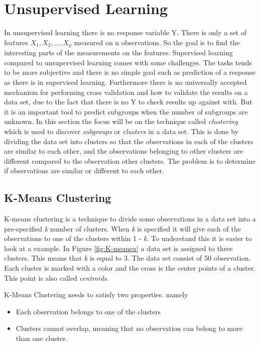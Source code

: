 \chapter{Unsupervised Learning}
\label{chp:unsuplea}
In unsupervised learning there is no response variable Y. There is only a set of features $X_1, X_2,..., X_p$ measured on n observations. So the goal is to find the interesting parts of the measurements on the features.
Supervised learning compared to unsupervised learning comes with some challenges. The tasks tends to be more subjective and there is no simple goal such as prediction of a response as there is in supervised learning. Furthermore there is no universally accepted mechanism for performing cross validation and how to validate the results on a data set, due to the fact that there is no Y to check results up against with.
But it is an important tool to predict subgroups when the number of subgroups are unknown.
In this section the focus will be on the  technique called \emph{clustering} which is used to discover \emph{subgroups} or \emph{clusters} in a data set. 
This is done by dividing the data set into clusters so that the observations in each of the clusters are similar to each other, and the observations belonging to other clusters are different compared to the observation other clusters.
The problem is to determine if observations are similar or different to each other.
 
\section{K-Means Clustering}
\label{chp:clus}
K-means clustering is a technique to divide some observations in a data set into a pre-specified \emph{k} number of clusters. When \emph{k} is specified it will give each of the observations to one of the clusters within 1 - \emph{k}. To understand this it is easier to look at a example. In
Figure \ref{fig:K-meanex} a data set is assigned to three clusters. This means that \emph{k} is equal to 3. The data set consist of 50 observation. Each cluster is marked with a color and the cross is the center points of a cluster. This point is also called \emph{centroids}.


K-Means Clustering needs to satisfy two properties. namely
\begin{itemize}
	\item Each observation belongs to one of the clusters
	\item Clusters cannot overlap, meaning that no observation can belong to more than one cluster.
\end{itemize} 

